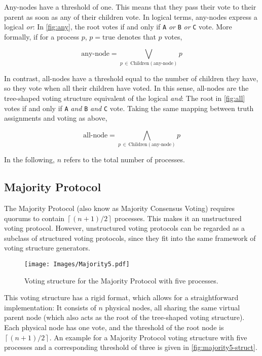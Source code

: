 \documentclass[draft,11pt,chapterprefix=true,toc=bibliography,numbers=noendperiod,
               footnotes=multiple,twoside]{scrreprt}
\begin{document}
Any-nodes have a threshold of one. This means that they pass their vote to their parent as soon as any of their children vote. In logical terms, any-nodes express a logical \emph{or}: In \autoref{fig:any}, the root votes if and only if \texttt{A} \emph{or} \texttt{B} \emph{or} \texttt{C} vote. More formally, if for a process \(p\), \(p = \text{true}\) denotes that \(p\) votes,

\[ \text{any-node} = \bigvee_{p\,\in\,\text{Children}(\text{any-node})} p \]

In contrast, all-nodes have a threshold equal to the number of children they have, so they vote when all their children have voted. In this sense, all-nodes are the tree-shaped voting structure equivalent of the logical \emph{and}: The root in \autoref{fig:all} votes if and only if \texttt{A} \emph{and} \texttt{B} \emph{and} \texttt{C} vote. Taking the same mapping between truth assignments and voting as above,

\[ \text{all-node} = \bigwedge_{p\,\in\,\text{Children}(\text{any-node})} p \]

In the following, \(n\) refers to the total number of processes.

\subsection{Majority Protocol}

The Majority Protocol (also know as Majority Consensus Voting\autocite{majority}) requires quorums to contain \(\left\lceil (n + 1) / 2 \right\rceil\) processes. This makes it an unstructured voting protocol. However, unstructured voting protocols can be regarded as a subclass of structured voting protocols, since they fit into the same framework of voting structure generators.

\begin{figure}[h]
    \centering
    \texttt{[image: Images/Majority5.pdf]}
    \caption{Voting structure for the Majority Protocol with five processes.}
    \label{fig:majority5-struct}
\end{figure}

This voting structure has a rigid format, which allows for a straightforward implementation: It consists of \(n\) physical nodes, all sharing the same virtual parent node (which also acts as the root of the tree-shaped voting structure). Each physical node has one vote, and the threshold of the root node is \(\left\lceil (n + 1) / 2 \right\rceil\). An example for a Majority Protocol voting structure with five processes and a corresponding threshold of three is given in \autoref{fig:majority5-struct}.
\end{document}
